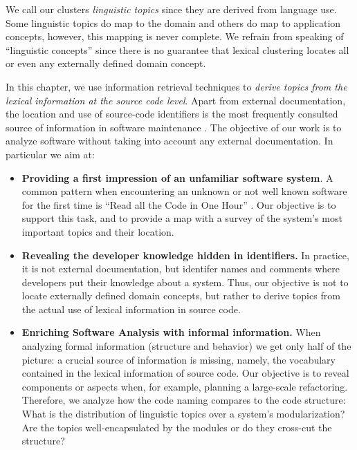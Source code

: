 We call our clusters \emph{linguistic topics} since they are derived from language use. Some linguistic topics do map to the domain and others do map to application concepts, however, this mapping is never complete. We refrain from speaking of ``linguistic concepts'' since there is no guarantee that lexical clustering locates all or even any externally defined domain concept. 

In this chapter, we use information retrieval techniques to \emph{derive topics from the lexical information at the source code level}. Apart from external documentation, the location and use of source-code identifiers is the most frequently consulted source of information in software maintenance \cite{Kosk04a}. The objective of our work is to analyze software without taking into account any external documentation. In particular we aim at:

\begin{itemize}
  \item \textbf{Providing a first impression of an unfamiliar software system}. A common pattern when encountering an unknown or not well known software for the first time is ``Read all the Code in One Hour'' \cite{Deme02a}. Our objective is to support this task, and to provide a map with a survey of the system's most important topics and their location.
  \item \textbf{Revealing the developer knowledge hidden in identifiers.} In practice, it is not external documentation, but identifer names and comments where developers put their knowledge about a system. Thus, our objective is not to locate externally defined domain concepts, but rather to derive topics from the actual use of lexical information in source code.
  \item \textbf{Enriching Software Analysis with informal information.} When analyzing formal information (\eg structure and behavior) we get only half of the picture: a crucial source of information is missing, namely, the vocabulary contained in the lexical information of source code. Our objective is to reveal components or aspects when, for example, planning a large-scale refactoring. Therefore, we analyze how the code naming compares to the code structure: What is the distribution of linguistic topics over a system's modularization? Are the topics well-encapsulated by the modules or do they cross-cut the structure?
\end{itemize}


